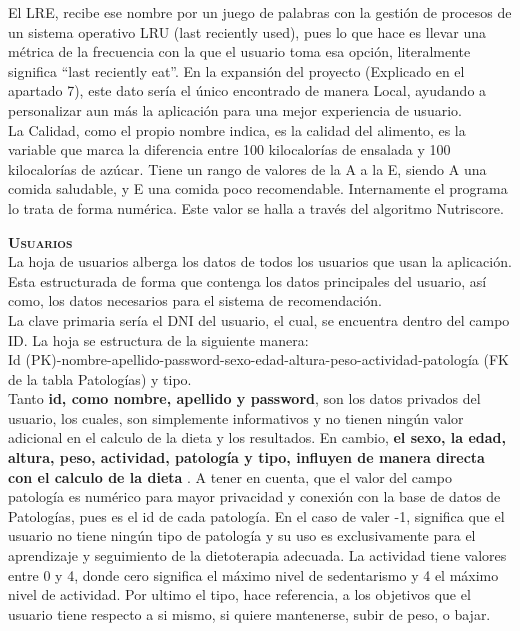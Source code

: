 El LRE, recibe ese nombre por un juego de palabras con la gestión de procesos de un sistema operativo LRU (last reciently used), pues lo que hace es llevar una métrica de la frecuencia con la que el usuario toma esa opción, literalmente significa “last reciently eat”. En la expansión del proyecto (Explicado en el apartado 7), este dato sería el único encontrado de manera Local, ayudando a personalizar aun más la aplicación para una mejor experiencia de usuario. \\

La Calidad, como el propio nombre indica, es la calidad del alimento, es la variable que marca la diferencia entre 100 kilocalorías de ensalada y 100 kilocalorías de azúcar. Tiene un rango de valores de la A a la E, siendo A una comida saludable, y E una comida poco recomendable. Internamente el programa lo trata de forma numérica. Este valor se halla a través del algoritmo Nutriscore.

\textbf{\textsc{Usuarios}}\\
La hoja de usuarios alberga los datos de todos los usuarios que usan la aplicación. Esta estructurada de forma que contenga los datos principales del usuario, así como, los datos necesarios para el sistema de recomendación. \\
La clave primaria sería el DNI del usuario, el cual, se encuentra dentro del campo ID. La hoja se estructura de la siguiente manera:\\
Id (PK)-nombre-apellido-password-sexo-edad-altura-peso-actividad-patología (FK de la tabla Patologías) y tipo.\\
Tanto \textbf{id, como nombre, apellido y password}, son los datos privados del usuario, los cuales, son simplemente informativos y no tienen ningún valor adicional en el calculo de la dieta y los resultados. En cambio, \textbf{el sexo, la edad, altura, peso, actividad, patología y tipo, influyen de manera directa con el calculo de la dieta} . A tener en cuenta, que el valor del campo patología es numérico para mayor privacidad y conexión con la base de datos de Patologías, pues es el id de cada patología. En el caso de valer -1, significa que el usuario no tiene ningún tipo de patología y su uso es exclusivamente para el aprendizaje y seguimiento de la dietoterapia adecuada. La actividad tiene valores entre 0 y 4, donde cero significa el máximo nivel de sedentarismo y 4 el máximo nivel de actividad. Por ultimo el tipo, hace referencia, a los objetivos que el usuario tiene respecto a si mismo, si quiere mantenerse, subir de peso, o bajar.\\

